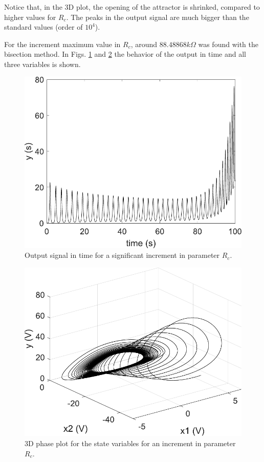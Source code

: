     Notice that, in the 3D plot, the opening of the attractor is shrinked, compared to higher values for $R_c$. The peaks in the output signal are much bigger than the standard values (order of $10^{4}$).
    
    For the increment maximum value in $R_c$, around $88.48868k\Omega$ was found with the bisection method. In Figs. \ref{fig:outParaCup} and \ref{fig:3dParaCup} the behavior of the output in time and all three variables is shown.
    \begin{figure}[H]
        \centering
        \includegraphics[scale=0.5]{figs/outParaCup.pdf}
        \caption{Output signal in time for a significant increment in parameter $R_c$.}
        \label{fig:outParaCup}
    \end{figure}
    \begin{figure}[H]
        \centering
        \includegraphics[scale=0.5]{figs/3dParaCup.pdf}
        \caption{3D phase plot for the state variables for an increment in parameter $R_c$.}
        \label{fig:3dParaCup}
    \end{figure}
    
